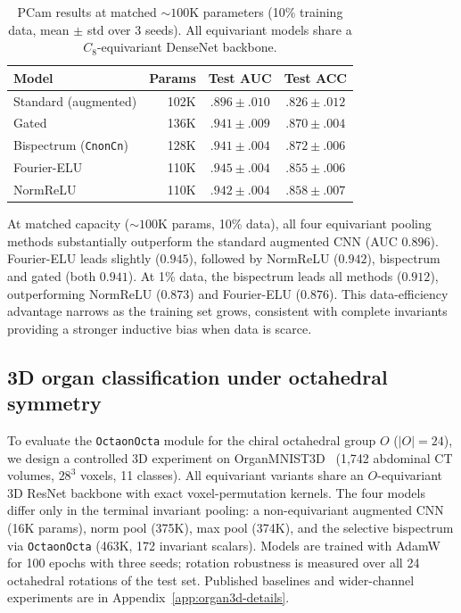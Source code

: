 \documentclass{article}
\theoremstyle{definition}
\theoremstyle{remark}
\theoremstyle{definition}
\begin{document}
\begin{table}[t]
  \caption{PCam results at matched ${\sim}100$K parameters (10\% training
    data, mean $\pm$ std over 3 seeds). All equivariant models share a
    $C_8$-equivariant DenseNet backbone.}
  \label{tab:pcam-results}
  \centering
  \small
  \begin{tabular}{lrcc}
    \toprule
    Model & Params & Test AUC & Test ACC \\
    \midrule
    Standard (augmented)          & 102K & $.896 \pm .010$ & $.826 \pm .012$ \\
    Gated                         & 136K & $.941 \pm .009$ & $.870 \pm .004$ \\
    Bispectrum (\texttt{CnonCn})  & 128K & $.941 \pm .004$ & $\mathbf{.872 \pm .006}$ \\
    Fourier-ELU                   & 110K & $\mathbf{.945 \pm .004}$ & $.855 \pm .006$ \\
    NormReLU                      & 110K & $.942 \pm .004$ & $.858 \pm .007$ \\
    \bottomrule
  \end{tabular}
\end{table}

At matched capacity (${\sim}100$K params, 10\% data), all four equivariant
pooling methods substantially outperform the standard augmented CNN
(AUC $0.896$). Fourier-ELU leads slightly ($0.945$), followed by
NormReLU ($0.942$), bispectrum and gated (both $0.941$).
At 1\% data, the bispectrum leads all methods ($0.912$), outperforming
NormReLU ($0.873$) and Fourier-ELU ($0.876$). This data-efficiency
advantage narrows as the training set grows, consistent with complete
invariants providing a stronger inductive bias when data is scarce.

\subsection{3D organ classification under octahedral symmetry}
\label{sec:organ3d}

To evaluate the \texttt{OctaonOcta} module for the chiral octahedral group
$O$ ($|O|=24$), we design a controlled 3D experiment on
OrganMNIST3D~\citep{medmnistv2} (1{,}742 abdominal CT volumes, $28^3$
voxels, 11 classes). All equivariant variants share an $O$-equivariant 3D
ResNet backbone with exact voxel-permutation kernels. The four models differ
only in the terminal invariant pooling: a non-equivariant augmented CNN
(16K params), norm pool (375K), max pool (374K), and the selective
bispectrum via \texttt{OctaonOcta} (463K, 172 invariant scalars). Models
are trained with AdamW~\citep{loshchilov2019adamw} for 100 epochs with
three seeds; rotation robustness is measured over all 24 octahedral
rotations of the test set. Published baselines and wider-channel experiments
are in Appendix~\ref{app:organ3d-details}.
\end{document}
